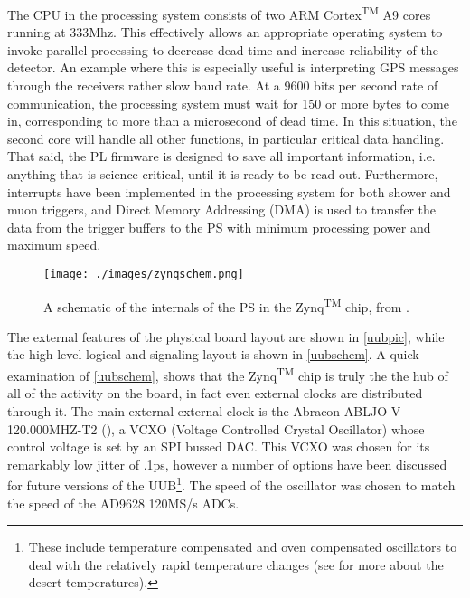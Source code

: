The CPU in the processing system consists of two ARM Cortex\textsuperscript{TM} A9 cores running at 333Mhz. This effectively allows an appropriate operating system to invoke parallel processing to decrease dead time and increase reliability of the detector. An example where this is especially useful is interpreting GPS messages through the receivers rather slow baud rate. At a 9600 bits per second rate of communication, the processing system must wait for 150 or more bytes to come in, corresponding to more than a microsecond of dead time. In this situation, the second core will handle all other functions, in particular critical data handling. That said, the PL firmware is designed to save all important information, i.e. anything that is science-critical, until it is ready to be read out. 
Furthermore, interrupts have been implemented in the processing system for both shower and muon triggers, and Direct Memory Addressing (DMA) is used to transfer the data from the trigger buffers to the PS with minimum processing power and maximum speed.

\begin{center}
\begin{figure}[H]
\texttt{[image: ./images/zynqschem.png]}
\caption[Zynq\textsuperscript{TM} Schematic]{A schematic of the internals of the PS in the Zynq\textsuperscript{TM} chip, from \textcite{zynq}.}
\label{zynqschem}
\end{figure}
\end{center}

The external features of the physical board layout are shown in \autoref{uubpic}, while the high level logical and signaling layout is shown in \autoref{uubschem}. A quick examination of \autoref{uubschem}, shows that the Zynq\textsuperscript{TM} chip is truly the the hub of all of the activity on the board, in fact even external clocks  are distributed through it. The main external external clock is the Abracon ABLJO-V-120.000MHZ-T2 (\cite{vcxo}), a VCXO (Voltage Controlled Crystal Oscillator) whose control voltage is set by an SPI bussed DAC. This VCXO was chosen for its remarkably low jitter of .1ps, however a number of options have been discussed for future versions of the UUB\footnote{These include temperature compensated and oven compensated oscillators to deal with the relatively rapid temperature changes (see  for more about the desert temperatures).}. The speed of the oscillator was chosen to match the speed of the AD9628 120MS/s ADCs. 

